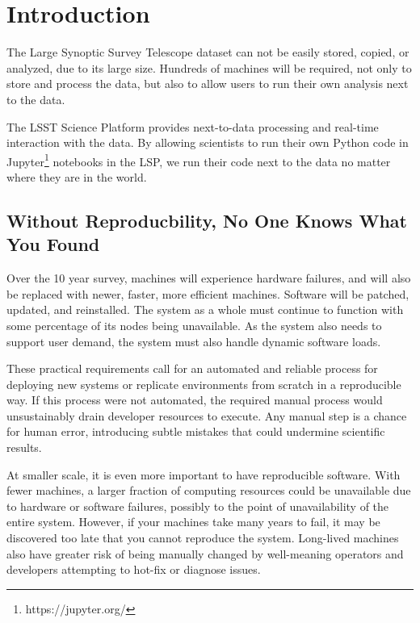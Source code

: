 \documentclass[11pt,twoside]{article}
\begin{document}
\section{Introduction}

The Large Synoptic Survey Telescope \citep[LSST;][]{2019ApJ...873..111I}
dataset can not be easily stored,
copied, or analyzed, due to its large size.  Hundreds of machines will be
required, not only to store and process the data, but also to allow users
to run their own analysis next to the data.

The LSST Science Platform \citep[LSP;][]{LSE-319,LDM-554,LDM-542} provides next-to-data processing and
real-time interaction with the data.  By allowing scientists to run their own
Python code in Jupyter\footnote{https://jupyter.org/} notebooks in the LSP,
we run their code next to the data no matter where they are in the world.

\subsection{Without Reproducbility, No One Knows What You Found}

Over the 10 year survey, machines will experience hardware failures, and
will also be replaced with newer, faster, more efficient machines.
Software will be patched, updated, and reinstalled.  The system as a whole
must continue to function with some percentage of its nodes being unavailable.
As the system also needs to support user demand, the system
must also handle dynamic software loads.

These practical requirements call for an automated and reliable process for
deploying new systems or replicate environments from scratch in a reproducible
way.  If this process were not automated, the required manual process would unsustainably
drain developer resources to execute.  Any manual step is a chance for human error,
introducing subtle mistakes that could undermine scientific results.

At smaller scale, it is even more important to have reproducible software.  With
fewer machines, a larger fraction of computing resources could be unavailable due to
hardware or software failures, possibly to the point of unavailability of the entire
system.  However, if your machines take many years to fail, it may be discovered too
late that you cannot reproduce the system.
Long-lived machines also have greater risk of being manually changed by
well-meaning operators and developers attempting to hot-fix or diagnose issues.
\end{document}

